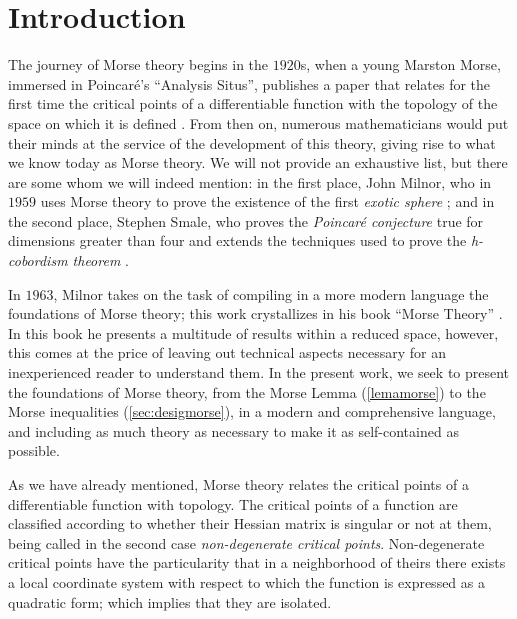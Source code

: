 \chapter*{Introduction}

The journey of Morse theory begins in the $1920$s, when a young Marston Morse, immersed in Poincaré's ``Analysis Situs'', publishes a paper that relates for the first time the critical points of a differentiable function with the topology of the space on which it is defined \cite{BottMarstonMorse}. From then on, numerous mathematicians would put their minds at the service of the development of this theory, giving rise to what we know today as Morse theory. We will not provide an exhaustive list, but there are some whom we will indeed mention: in the first place, John Milnor, who in $1959$ uses Morse theory to prove the existence of the first \textit{exotic sphere} \cite{milnor2010manifolds}; and in the second place, Stephen Smale, who proves the \textit{Poincaré conjecture} true for dimensions greater than four and extends the techniques used to prove the \textit{h-cobordism theorem} \cite{bott1988morse}. %

In $1963$, Milnor takes on the task of compiling in a more modern language the foundations of Morse theory; this work crystallizes in his book ``Morse Theory'' \cite{milnor1963}. In this book he presents a multitude of results within a reduced space, however, this comes at the price of leaving out technical aspects necessary for an inexperienced reader to understand them. In the present work, we seek to present the foundations of Morse theory, from the Morse Lemma (\ref{lemamorse}) to the Morse inequalities (\ref{sec:desigmorse}), in a modern and comprehensive language, and including as much theory as necessary to make it as self-contained as possible. %

As we have already mentioned, Morse theory relates the critical points of a differentiable function with topology. The critical points of a function are classified according to whether their Hessian matrix is singular or not at them, being called in the second case \textit{non-degenerate critical points}. Non-degenerate critical points have the particularity that in a neighborhood of theirs there exists a local coordinate system with respect to which the function is expressed as a quadratic form; which implies that they are isolated.

